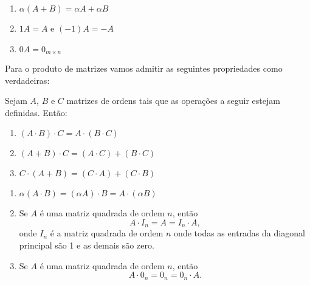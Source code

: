 \documentclass{beamer}
\begin{document}
    \begin{frame}
        \begin{proposicao}
            \begin{enumerate}[label={\roman*})]
                \conti

                \item $\alpha(A + B) = \alpha A + \alpha B$
                \item $1A = A$ e $(-1)A = -A$
                \item  $0A = 0_{m \times n}$
            \end{enumerate}
        \end{proposicao}
    \end{frame}

    \begin{frame}
        Para o produto de matrizes vamos admitir as seguintes propriedades como verdadeiras:
        \begin{proposicao}
	    Sejam $A$, $B$ e $C$ matrizes de ordens tais que as operações a seguir estejam definidas. Ent\~ao:
            \begin{enumerate}[label={\roman*})]
                \item $(A\cdot B)\cdot C = A\cdot(B \cdot C)$
                \item $(A + B)\cdot C = (A\cdot C) + (B\cdot C)$
                \item $C\cdot(A + B) = (C\cdot A) + (C\cdot B)$
                \seti
            \end{enumerate}
        \end{proposicao}
    \end{frame}

    \begin{frame}
        \begin{proposicao}
            \begin{enumerate}[label={\roman*})]
                \conti

                \item $\alpha(A\cdot B) = (\alpha A)\cdot B = A \cdot(\alpha B)$
                \item Se $A$ é uma matriz quadrada de ordem $n$, então \[A\cdot I_n = A = I_n\cdot A,\] onde $I_n$ é a matriz quadrada de ordem $n$ onde todas as entradas da diagonal principal são 1 e as demais são zero.
                \item Se $A$ é uma matriz quadrada de ordem $n$, então \[A\cdot0_n = 0_n = 0_n\cdot A.\]
	    \end{enumerate}
        \end{proposicao}
    \end{frame}
\end{document}

